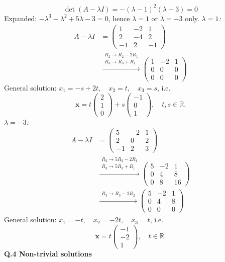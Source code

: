\[ \det(A-\lambda I)=- \left(\lambda - 1\right)^{2} \left(\lambda + 3\right)=0 \]
Expanded: $- \lambda^{3} - \lambda^{2} + 5 \lambda - 3=0$, hence $\lambda=1$ or $\lambda=-3$ only.
\noindent\emph{$\lambda=1$:}
\begin{align*}
A-\lambda I &= \begin{pmatrix}1 & -2 & 1 \\ 2 & -4 & 2 \\ -1 & 2 & -1\end{pmatrix} \\
&\xrightarrow{\substack{R_2\to R_2-2R_1\\ R_3\to R_3+R_1}} \begin{pmatrix}1 & -2 & 1 \\ 0 & 0 & 0 \\ 0 & 0 & 0\end{pmatrix}
\end{align*}
General solution: $x_1=- s + 2 t, \quad x_2=t, \quad x_3=s$, i.e. \[ \mathbf{x}=t\begin{pmatrix}2 \\ 1 \\ 0\end{pmatrix} + s\begin{pmatrix}-1 \\ 0 \\ 1\end{pmatrix}, \quad t, s\in\mathbb{R}. \]
\noindent\emph{$\lambda=-3$:}
\begin{align*}
A-\lambda I &= \begin{pmatrix}5 & -2 & 1 \\ 2 & 0 & 2 \\ -1 & 2 & 3\end{pmatrix} \\
&\xrightarrow{\substack{R_2\to 5R_2-2R_1\\ R_3\to 5R_3+R_1}} \begin{pmatrix}5 & -2 & 1 \\ 0 & 4 & 8 \\ 0 & 8 & 16\end{pmatrix} \\
&\xrightarrow{\substack{R_3\to R_3-2R_2}} \begin{pmatrix}5 & -2 & 1 \\ 0 & 4 & 8 \\ 0 & 0 & 0\end{pmatrix}
\end{align*}
General solution: $x_1=- t, \quad x_2=- 2 t, \quad x_3=t$, i.e. \[ \mathbf{x}=t\begin{pmatrix}-1 \\ -2 \\ 1\end{pmatrix}, \quad t\in\mathbb{R}. \]
\medskip\noindent\textbf{Q.4  Non-trivial solutions}\par\smallskip

